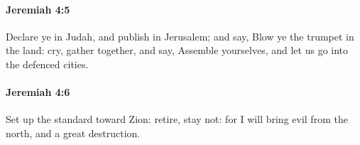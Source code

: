		\paragraph{Jeremiah 4:5} %
			\label{JEREMIAH-4-5}

			Declare ye in Judah, and publish in Jerusalem; and say, Blow ye the trumpet in the land: cry, gather together, and say, Assemble yourselves, and let us go into the defenced cities.


		\paragraph{Jeremiah 4:6} %
			\label{JEREMIAH-4-6}

			Set up the standard toward Zion: retire, stay not: for I will bring evil from the north, and a great destruction.


